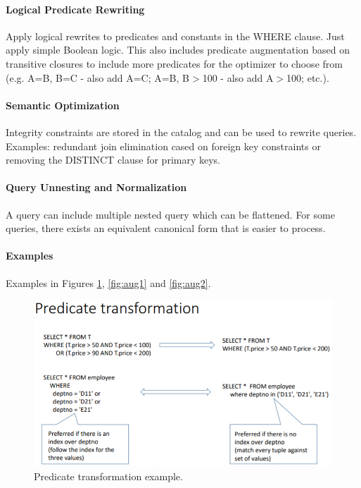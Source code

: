 \paragraph{Logical Predicate Rewriting}
Apply logical rewrites to predicates and constants in the WHERE clause. Just apply simple Boolean logic. This also includes predicate augmentation based on transitive closures to include more predicates for the optimizer to choose from (e.g. A=B, B=C - also add A=C; A=B, B$>$100 - also add A$>$100; etc.).

\paragraph{Semantic Optimization}
Integrity constraints are stored in the catalog and can be used to rewrite queries. Examples: redundant join elimination cased on foreign key constraints or removing the DISTINCT clause for primary keys. 

\paragraph{Query Unnesting and Normalization}
A query can include multiple nested query which can be flattened. For some queries, there exists an equivalent canonical form that is easier to process.

\paragraph{Examples}
Examples in Figures \ref{fig:transormation}, \ref{fig:aug1} and \ref{fig:aug2}.

\begin{figure}[h]
	\centering
	\includegraphics[scale=0.5]{images/3-transformation.PNG}
	\caption{Predicate transformation example.}
	\label{fig:transormation}
\end{figure}

